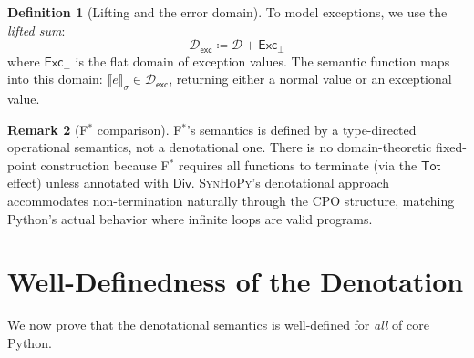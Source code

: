 \documentclass[11pt,a4paper]{report}
\theoremstyle{definition}
\newtheorem{definition}{Definition}[chapter]
\newtheorem{remark}[definition]{Remark}
\theoremstyle{plain}
\newcommand{\den}[1]{\llbracket #1 \rrbracket}
\newcommand{\defeq}{\coloneqq}
\newcommand{\fstar}{F$^{*}$}
\newcommand{\synhopy}{\textsc{SynHoPy}}
\begin{document}
\begin{definition}[Lifting and the error domain]
To model exceptions, we use the \emph{lifted sum}:
\[
  \mathcal{D}_\mathsf{exc} \defeq \mathcal{D} + \mathsf{Exc}_\bot
\]
where $\mathsf{Exc}_\bot$ is the flat domain of exception values.  The
semantic function maps into this domain:
$\den{e}_\sigma \in \mathcal{D}_\mathsf{exc}$, returning either a normal
value or an exceptional value.
\end{definition}

\begin{remark}[\fstar{} comparison]
\fstar{}'s semantics is defined by a type-directed operational semantics,
not a denotational one.  There is no domain-theoretic fixed-point construction
because \fstar{} requires all functions to terminate (via the $\mathsf{Tot}$
effect) unless annotated with $\mathsf{Div}$.  \synhopy{}'s denotational
approach accommodates non-termination naturally through the CPO structure,
matching Python's actual behavior where infinite loops are valid programs.
\end{remark}


\section{Well-Definedness of the Denotation}

We now prove that the denotational semantics is well-defined for
\emph{all} of core Python.
\end{document}
